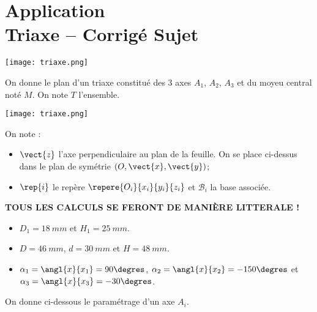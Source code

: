\chapter*{Application  \\ 
Triaxe -- \ifprof Corrigé \else Sujet \fi}

\iflivret {} \else
\ifprof  {} \else \fi
\fi

\setcounter{question}{0}
\begin{marginfigure}[3cm]
\texttt{[image: triaxe.png]}
\end{marginfigure}



On donne le plan d'un triaxe constitué des 3 axes $A_1$, $A_2$, $A_3$ et du moyeu central noté $M$. On note  $T$ l'ensemble.

\begin{center}
\texttt{[image: triaxe.png]}
\end{center}
On note :
\begin{itemize}
\item $\vect{z}$ l'axe perpendiculaire au plan de la feuille. On se place ci-dessus dans le plan de symétrie $\left(O,\vect{x},\vect{y}\right)$;
\item $\rep{i}$ le repère $\repere{O_i}{x_i}{y_i}{z_i}$ et $\mathcal{B}_i$ la base associée.
\end{itemize}





\textbf{TOUS LES CALCULS SE FERONT DE MANIÈRE LITTERALE !}
\begin{itemize}
\item $D_1=\SI{18}{mm}$ et $H_1=\SI{25}{mm}$.
\item $D=\SI{46}{mm}$, $d=\SI{30}{mm}$ et $H=\SI{48}{mm}$.
\item $\alpha_1=\angl{x}{x_1}=90\degres$, $\alpha_2=\angl{x}{x_2}=-150\degres$ et 
$\alpha_3=\angl{x}{x_3}=-30\degres$.
\end{itemize}

On donne ci-dessous le paramétrage d'un axe $A_i$.

